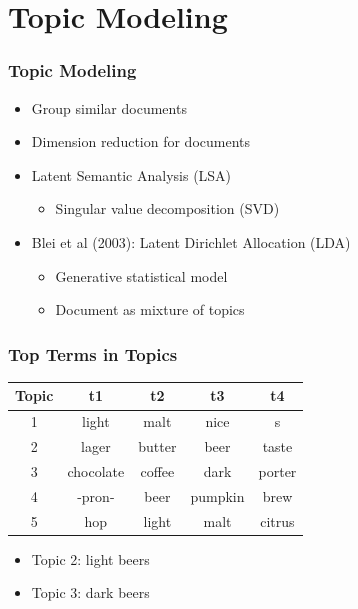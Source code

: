 
 \section{Topic Modeling}

\begin{frame}
    \frametitle{Topic Modeling}
\begin{itemize}
    \item Group similar documents
    \item Dimension reduction for documents
\end{itemize}
\begin{itemize}
    \item Latent Semantic Analysis (LSA)
    \begin{itemize}
    \item Singular value decomposition (SVD)
    \end{itemize}
    \end{itemize}
\begin{itemize}
    \item {\color{iseblue}Blei et al (2003)}: Latent Dirichlet Allocation (LDA)
    \begin{itemize}
    \item Generative statistical model
    \item Document as mixture of topics
    \end{itemize}
\end{itemize}

\end{frame}

 \begin{frame}
    \frametitle{Top Terms in Topics}
\begin{center}
\begin{tabular}{ c | c c c c }
\hline
\hline
Topic & t1 & t2 & t3 & t4 \\
\hline
1 & light & malt & nice & s \\
2 & lager & butter & beer & taste \\
3 & chocolate & coffee & dark & porter  \\
4 & -pron- & beer & pumpkin & brew \\
5 & hop & light & malt & citrus  \\
 \hline
 \hline
\end{tabular}
\end{center}

\begin{itemize}
    \item Topic 2: light beers
    \item Topic 3: dark beers
\end{itemize}
\end{frame}

